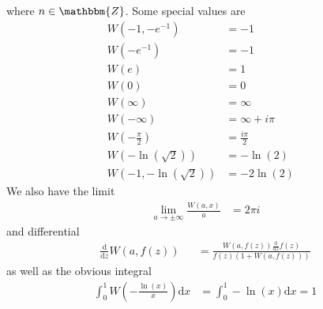 \documentclass{amsart}
\newcommand{\mathd}{\mathrm{d}}
\begin{document}
where $n \in \mathbbm{Z}$. Some special values are
\begin{equation}
  \begin{array}{lll}
    W ( - 1, - e^{- 1}) & = - 1 & \\
    W (- e^{- 1}) & = - 1 & \\
    W (e) & = 1 & \\
    W (0) & = 0 & \\
    W (\infty) & = \infty & \\
    W (- \infty) & = \infty + i \pi & \\
    W \left( - \frac{\pi}{2} \right) & = \frac{i \pi}{2} & \\
    W \left( - \ln ( \sqrt{2}) \right) & = - \ln (2) & \\
    W \left( - 1, - \ln ( \sqrt{2}) \right) & = - 2 \ln (2) & 
  \end{array}
\end{equation}
We also have the limit
\begin{equation}
  \begin{array}{ll}
    \lim_{a \rightarrow \pm \infty} \frac{W (a, x)}{a} & = 2 \pi i
  \end{array}
\end{equation}
and differential
\begin{equation}
  \begin{array}{lll}
    \frac{\mathd}{\mathd z} W (a, f (z)) &  & = \frac{W (a, f (z))
    \frac{\mathd}{\mathd z} f (z)}{f (z) (1 + W (a, f (z)))}
  \end{array}
\end{equation}
as well as the obvious integral
\begin{equation}
  \begin{array}{ll}
    \int_0^1 W \left( - \frac{\ln (x)}{x} \right) \mathd x & = \int_0^1 - \ln
    (x) \mathd x = 1
  \end{array}
\end{equation}
\end{document}
